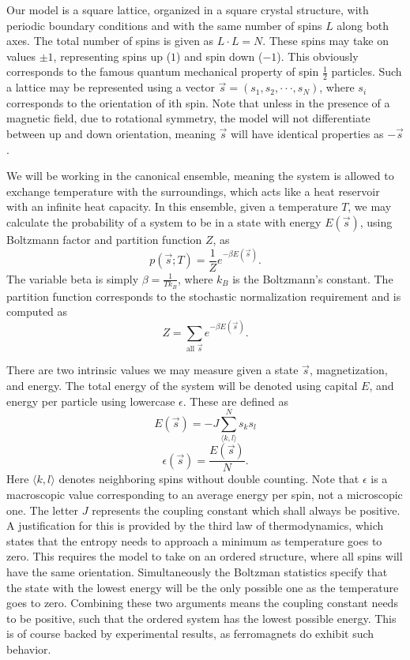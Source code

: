 \documentclass[english,notitlepage,reprint,nofootinbib]{revtex4-1}  %
\begin{document}
Our model is a square lattice, organized in a square crystal structure, with periodic boundary conditions and with the same number of spins $L$ along both axes. The total number of spins is given as $L \cdot L = N$. These spins may take on values $\pm1$, representing spins up ($1$) and spin down ($-1$). This obviously corresponds to the famous quantum mechanical property of spin $\frac{1}{2}$ particles. Such a lattice may be represented using a vector $\vec{s} = (s_1, s_2, \cdot \cdot \cdot, s_N)$, where $s_i$ corresponds to the orientation of ith spin. Note that unless in the presence of a magnetic field, due to rotational symmetry, the model will not differentiate between up and down orientation, meaning $\vec{s}$ will have identical properties as $ - \vec{s}$.

We will be working in the canonical ensemble, meaning the system is allowed to exchange temperature with the surroundings, which acts like a heat reservoir with an infinite heat capacity. In this ensemble, given a temperature $T$, we may calculate the probability of a system to be in a state with energy $E(\vec{s})$, using Boltzmann factor and partition function $Z$, as
\begin{equation}
    p(\vec{s};T) = \frac{1}{Z} e^{- \beta E(\vec{s})}.
\end{equation}
The variable beta is simply $\beta = \frac{1}{T k_B}$, where $k_B$ is the Boltzmann's constant. The partition function corresponds to the stochastic normalization requirement and is computed as
\begin{equation}
    Z = \sum_{\text{all } \vec{s}} e^{- \beta E(\vec{s})}.
\end{equation}

There are two intrinsic values we may measure given a state $\vec{s}$, magnetization, and energy. The total energy of the system will be denoted using capital $E$, and energy per particle using lowercase $\epsilon$. These are defined as
\begin{equation}
    E(\vec{s}) = -J \sum _{\langle k,l \rangle} ^N s_k s_l
\end{equation}
\begin{equation}
    \epsilon (\vec{s}) = \frac{E(\vec{s})}{N} .
\end{equation}
Here $\langle k,l \rangle$ denotes neighboring spins without double counting. Note that $\epsilon$ is a macroscopic value corresponding to an average energy per spin, not a microscopic one. The letter $J$ represents the coupling constant which shall always be positive. A justification for this is provided by the third law of thermodynamics, which states that the entropy needs to approach a minimum as temperature goes to zero. This requires the model to take on an ordered structure, where all spins will have the same orientation. Simultaneously the Boltzman statistics specify that the state with the lowest energy will be the only possible one as the temperature goes to zero. Combining these two arguments means the coupling constant needs to be positive, such that the ordered system has the lowest possible energy. This is of course backed by experimental results, as ferromagnets do exhibit such behavior.
\end{document}
